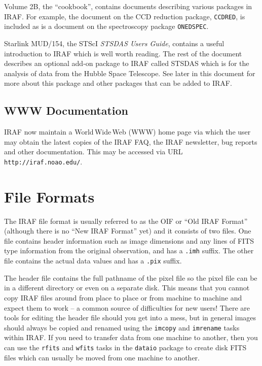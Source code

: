 Volume 2B, the ``cookbook'', contains documents
describing various packages in IRAF. For example, the document on the
CCD reduction package, {\tt CCDRED}, is included as is a document on
the spectroscopy package {\tt ONEDSPEC}.

Starlink MUD/154, the STScI {\it STSDAS Users Guide}\/, contains a useful
introduction to IRAF which is well worth reading. The rest of the
document describes an optional add-on package to IRAF called STSDAS
which is for the analysis of data from the Hubble Space Telescope. See
later in this document for more about this package and other packages
that can be added to IRAF.

\subsection*{WWW Documentation}

IRAF now maintain a World\,Wide\,Web (WWW) home page via which
the user may obtain the latest copies of the IRAF FAQ, the IRAF newsletter,
bug reports and other documentation. This may be accessed via URL
{\tt http://iraf.noao.edu/}.

\section{File Formats}

The IRAF file format is usually referred to as the OIF or ``Old IRAF
Format'' (although there is no ``New IRAF Format'' yet) and it consists of
two files. One file contains header information such as image
dimensions and any lines of FITS type information from the original
observation, and has a {\tt .imh} suffix. The other file contains the
actual data values and has a {\tt .pix} suffix.

The header file contains the full pathname of the pixel file so the
pixel file can be in a different directory or even on a separate
disk. This means that you cannot copy IRAF files around from place to
place or from machine to machine and expect them to work -- a common
source of difficulties for new users! There are tools for editing the
header file should you get into a mess, but in general images should
always be copied and renamed using the {\tt imcopy} and {\tt imrename}
tasks within IRAF. If you need to transfer data from one machine to
another, then you can use the {\tt rfits} and {\tt wfits} tasks in the
{\tt dataio} package to create disk FITS files which can usually be
moved from one machine to another.


